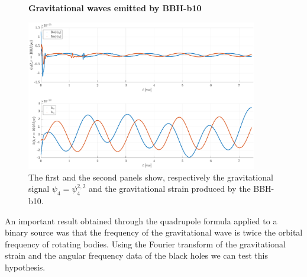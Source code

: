       \begin{figure}[H]
\centering
    \textbf{Gravitational waves emitted by BBH-b10}\par\medskip
\centering   
\includegraphics[width=0.9\textwidth]{numerical_evolution/gw_b10.eps}
\caption{The first and the second panels show, respectively the gravitational signal $\psi_4=\psi_4 ^{2,2}$ and the gravitational strain produced by the BBH-b10.}
\label{gw_b10}
\end{figure}
An important result obtained through the quadrupole formula applied to a binary source was that the frequency of the gravitational wave is twice the orbital frequency of rotating bodies.
Using the Fourier transform of the gravitational strain and the angular frequency data of the black holes we can test this hypothesis.\\
